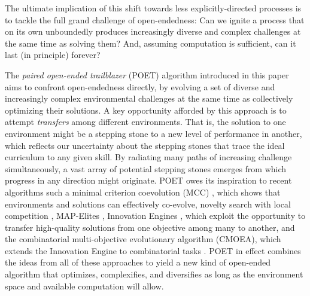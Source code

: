 \documentclass{article}
\begin{document}
The ultimate implication of this shift towards less explicitly-directed processes is to tackle the full grand challenge of open-endedness: Can we ignite a process that on its own unboundedly produces increasingly diverse and complex challenges at the same time as solving them?  And, assuming computation is sufficient, can it last (in principle) forever?  

The \emph{paired open-ended trailblazer} (POET) algorithm introduced in this paper aims to confront open-endedness directly, by evolving a set of diverse and increasingly complex environmental challenges at the same time as collectively optimizing their solutions.  A key opportunity afforded by this approach is to attempt \emph{transfers} among different environments.  That is, the solution to one environment might be a stepping stone to a new level of performance in another, which reflects our uncertainty about the stepping stones that trace the ideal curriculum to any given skill.  By radiating many 
paths of increasing challenge simultaneously, a vast array of potential stepping stones emerges from which progress in any direction might originate.  POET owes its inspiration to recent algorithms such a minimal criterion coevolution (MCC) \cite{brant:mcc17}, which shows that environments and solutions can effectively co-evolve, novelty search with local competition \cite{lehman:gecco11}, MAP-Elites \cite{mouret2015illuminating,cully:nature15}, Innovation Engines \cite{nguyen2016innovative}, which exploit the opportunity to transfer high-quality solutions from one objective among many to another, and the 
combinatorial multi-objective evolutionary algorithm (CMOEA), which extends the Innovation Engine to combinatorial tasks \cite{huizinga2016does, Joost:arxiv18}.
POET in effect combines the ideas from all of these approaches to yield a new kind of open-ended algorithm that optimizes, complexifies, and diversifies as long as the environment space and available computation will allow.
\end{document}
